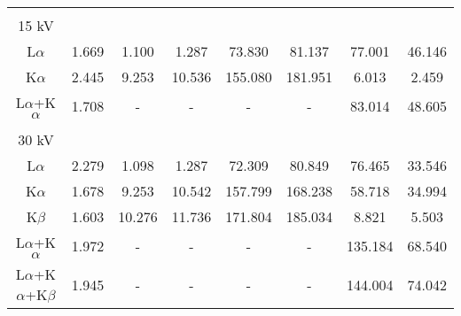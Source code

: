 \begin{table}[ht]
\begin{tabular}{cccccccc}
        \hline
                                     &       &                &                &              &              &         &        \\
        15 kV                        &       &                &                &              &              &         &        \\
        L$\alpha$                    & 1.669 & 1.100          & 1.287          & 73.830       & 81.137       & 77.001  & 46.146 \\
        K$\alpha$                    & 2.445 & 9.253          & 10.536         & 155.080      & 181.951      & 6.013   & 2.459  \\
        L$\alpha$+K$\alpha$          & 1.708 & -              & -              & -            & -            & 83.014  & 48.605 \\

        \hline
                                     &       &                &                &              &              &         &        \\
        30 kV                        &       &                &                &              &              &         &        \\
        L$\alpha$                    & 2.279 & 1.098          & 1.287          & 72.309       & 80.849       & 76.465  & 33.546 \\
        K$\alpha$                    & 1.678 & 9.253          & 10.542         & 157.799      & 168.238      & 58.718  & 34.994 \\
        K$\beta$                     & 1.603 & 10.276         & 11.736         & 171.804      & 185.034      & 8.821   & 5.503  \\
        L$\alpha$+K$\alpha$          & 1.972 & -              & -              & -            & -            & 135.184 & 68.540 \\
        L$\alpha$+K$\alpha$+K$\beta$ & 1.945 & -              & -              & -            & -            & 144.004 & 74.042
    \end{tabular}
\end{table}
